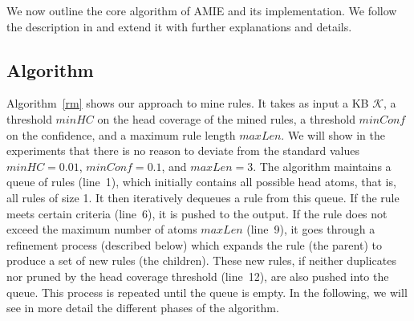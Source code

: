 
We now outline the core algorithm of AMIE and its implementation.
We follow the description in \cite{amie} and extend it with further explanations and details.

\subsection{Algorithm}
\label{subsec:algorithm}

Algorithm~\ref{rm} shows our approach to mine rules. It takes as input a KB $\mathcal{K}$, a threshold $minHC$ on the head coverage of the mined rules, a threshold $minConf$ on the confidence, and a maximum rule length $maxLen$.  We will show in the experiments that there is no reason to deviate from the standard values $minHC=0.01$, $minConf=0.1$, and $maxLen=3$.
The algorithm maintains a queue of rules (line~1), which initially contains all possible head atoms, that is, all rules of size 1.
It then iteratively dequeues a rule from this queue.
If the rule meets certain criteria (line~6), it is pushed to the output.
If the rule does not exceed the maximum number of atoms $maxLen$ (line~9), it goes through a refinement process (described below) which
expands the rule (the parent) to produce a set of new rules (the children). These new rules, 
if neither duplicates nor pruned by the head coverage threshold (line~12),  
are also pushed into the queue.
This process is repeated until the queue is empty. 
In the following, we will see in more detail the different phases of the algorithm.





